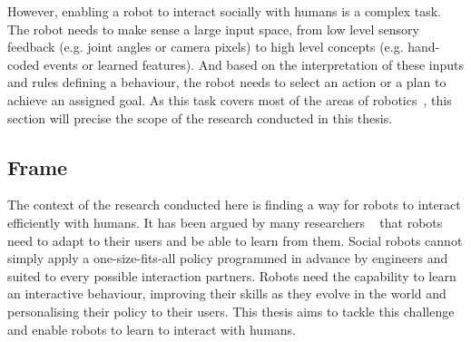 


However, enabling a robot to interact socially with humans is a complex task. The robot needs to make sense a large input space, from low level sensory feedback (e.g. joint angles or camera pixels) to high level concepts (e.g. hand-coded events or learned features). And based on the interpretation of these inputs and rules defining a behaviour, the robot needs to select an action or a plan to achieve an assigned goal. As this task covers most of the areas of robotics~\citep{fong2003survey}, this section will precise the scope of the research conducted in this thesis.

\subsection{Frame}

The context of the research conducted here is finding a way for robots to interact efficiently with humans. It has been argued by many researchers ~\citep{dautenhahn2004robots,billard2008robot} that robots need to adapt to their users and be able to learn from them. Social robots cannot simply apply a one-size-fits-all policy programmed in advance by engineers and suited to every possible interaction partners. Robots need the capability to learn an interactive behaviour, improving their skills as they evolve in the world and personalising their policy to their users. This thesis aims to tackle this challenge and enable robots to learn to interact with humans.

